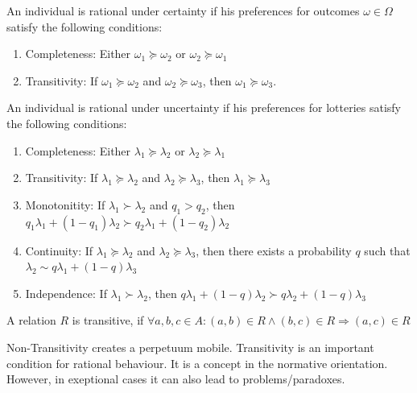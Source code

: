 \vspace{1\baselineskip}

An individual is rational under certainty if his preferences for outcomes
$\omega \in \Omega$ satisfy the following conditions:
\begin{enumerate}[1)]
    \item Completeness: Either $\omega_1 \succcurlyeq \omega_2$ or $\omega_2 \succcurlyeq \omega_1$
    \item Transitivity: If $\omega_1 \succcurlyeq \omega_2$ and $\omega_2 \succcurlyeq \omega_3$,
        then $\omega_1 \succcurlyeq \omega_3$.
\end{enumerate}
An individual is rational under uncertainty if his preferences for lotteries satisfy
the following conditions:
\begin{enumerate}[1)]
    \item Completeness: Either $\lambda_1 \succcurlyeq \lambda_2$ or $\lambda_2 \succcurlyeq \lambda_1$
    \item Transitivity: If $\lambda_1 \succcurlyeq \lambda_2$ and $\lambda_2 \succcurlyeq \lambda_3$,
        then $\lambda_1 \succcurlyeq \lambda_3$
    \item Monotonitity: If $\lambda_1 \succ \lambda_2$ and $q_1 > q_2$, then
        $q_1 \lambda_1 + (1-q_1) \lambda_2 \succ q_2 \lambda_1 + (1-q_2) \lambda_2$
    \item Continuity: If $\lambda_1 \succcurlyeq \lambda_2$ and $\lambda_2 \succcurlyeq \lambda_3$,
        then there exists a probability $q$ such that $\lambda_2 \sim q \lambda_1 + (1-q) \lambda_3$
    \item Independence: If $\lambda_1 \succ \lambda_2$, then $q \lambda_1 + (1-q) \lambda_2
        \succ q \lambda_2 + (1-q) \lambda_3$
\end{enumerate}

\vspace{1\baselineskip}

\begin{definition}[Transitivity]
    A relation $R$ is transitive, if $\forall a,b,c \in A: (a,b) \in R \wedge
    (b,c) \in R \Rightarrow (a,c) \in R$
\end{definition}

\vspace{1\baselineskip}

Non-Transitivity creates a perpetuum mobile. Transitivity is an important
condition for rational behaviour. It is a concept in the normative orientation.
However, in exeptional cases it can also lead to problems/paradoxes.

